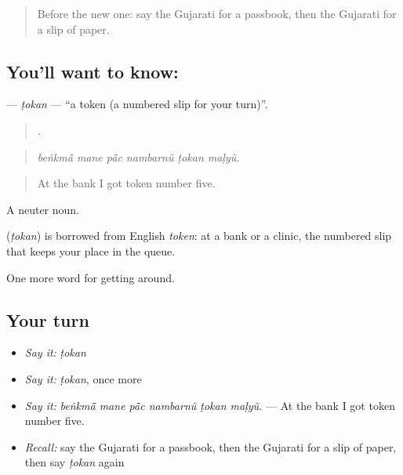\label{lesson:GU-C424-tokan}



\begin{quote}
Before the new one: say the Gujarati for a passbook, then the Gujarati for a slip of paper.
\end{quote}

\subsection*{You'll want to know: }
\textbf{} — \emph{ṭokan} — \textquotedblleft{}a token (a numbered slip for your turn)\textquotedblright{}.

\begin{quote}
     .
\end{quote}

\begin{quote}
\emph{beṅkmā̃ mane pā̃c nambarnũ ṭokan maḷyũ.}
\end{quote}

\begin{quote}
At the bank I got token number five.
\end{quote}

A neuter noun.

\begin{cousinweb}
\textbf{} (\emph{ṭokan}) is borrowed from English \emph{token}: at a bank or a clinic, the numbered slip that keeps your place in the queue.
\end{cousinweb}

\begin{grammarlens}[title={What you've built}]
One more word for getting around.
\end{grammarlens}

\subsection*{Your turn}
\begin{itemize}
\raggedright
  \item \emph{Say it:} \emph{ṭokan}
  \item \emph{Say it:} \emph{ṭokan}, once more
  \item \emph{Say it:} \emph{beṅkmā̃ mane pā̃c nambarnũ ṭokan maḷyũ.} — At the bank I got token number five.
  \item \emph{Recall:} say the Gujarati for a passbook, then the Gujarati for a slip of paper, then say \emph{ṭokan} again
\end{itemize}

